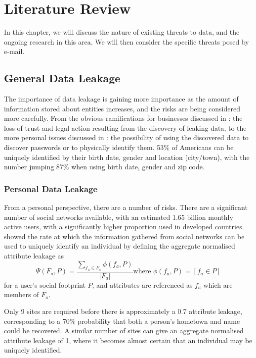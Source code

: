\chapter{Literature Review}\label{chap:exres}

In this chapter, we will discuss the nature of existing threats to data, and
the ongoing research in this area.  We will then consider the specific threats
posed by e-mail.

\section{General Data Leakage}

The importance of data leakage is gaining more importance as the amount of
information stored about entities increases, and the risks are being considered
more carefully.  From the obvious ramifications for businesses discussed in
\cite{papadimitriou2011data}: the loss of trust and legal action resulting from
the discovery of leaking data, to the more personal issues discussed in
\cite{irani2011modeling}: the possibility of using the discovered data to
discover passwords or to physically identify them.  53\% of Americans can be
uniquely identified by their birth date, gender and location (city/town), with
the number jumping 87\% when using birth date, gender and zip code.

\subsection{Personal Data Leakage}

From a personal perspective, there are a number of risks.  There are a
significant number of social networks available, with an estimated 1.65 billion
monthly active users, with a significantly higher proportion used in developed
countries.  \cite{irani2011modeling} showed the rate at which the information
gathered from social networks can be used to uniquely identify an individual by
defining the aggregate normalised attribute leakage as
\[\Psi(F_a,P)=\frac{\sum_{f_a\in F_a}\phi\left(f_a, P\right)}{|F_a|} \text{
		where }\phi\left(f_a, P\right) = \left[f_a\in P\right]\] for a
user's social footprint $P$, and attributes are referenced as $f_a$ which are
members of $F_a$.

Only 9 sites are required before there is approximately a 0.7 attribute
leakage, corresponding to a 70\% probability that both a person's hometown and
name could be recovered.  A similar number of sites can give an aggregate
normalised attribute leakage of 1, where it becomes almost certain that an
individual may be uniquely identified.

